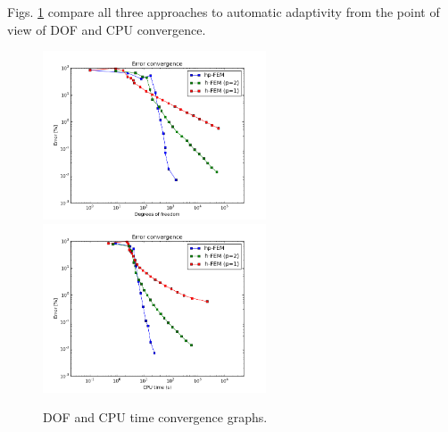 Figs. \ref{fig:nist-4-conv} compare all
three approaches to automatic adaptivity from the point
of view of DOF and CPU convergence.

\begin{figure}[!ht]
\centering
\includegraphics[height=5cm]{nist/nist-4/conv_dof_aniso.png}\ \
\includegraphics[height=5cm]{nist/nist-4/conv_cpu_aniso.png}
\caption{DOF and CPU time convergence graphs.}
\label{fig:nist-4-conv}
\end{figure}

